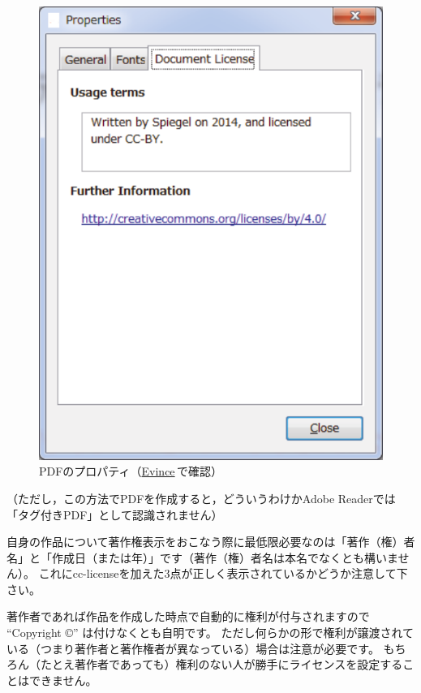 \documentclass{ltjsarticle}
\begin{document}
\begin{figure}[htp]
\begin{center}
\includegraphics[width=4truecm,clip]{images/pdf-property.pdf}
\end{center}
\caption{PDFのプロパティ（\href{https://wiki.gnome.org/Apps/Evince}{Evince}\,で確認）} \label{fig:pdf-prop}
\end{figure}%
（ただし，この方法でPDFを作成すると，どういうわけかAdobe Readerでは「タグ付きPDF」として認識されません）

自身の作品について著作権表示をおこなう際に最低限必要なのは「著作（権）者名」と「作成日（または年）」です（著作（権）者名は本名でなくとも構いません）。
これにcc-licenseを加えた3点が正しく表示されているかどうか注意して下さい。

著作者であれば作品を作成した時点で自動的に権利が付与されますので ``Copyright \copyright'' は付けなくとも自明です。
ただし何らかの形で権利が譲渡されている（つまり著作者と著作権者が異なっている）場合は注意が必要です。
もちろん（たとえ著作者であっても）権利のない人が勝手にライセンスを設定することはできません。
\end{document}
